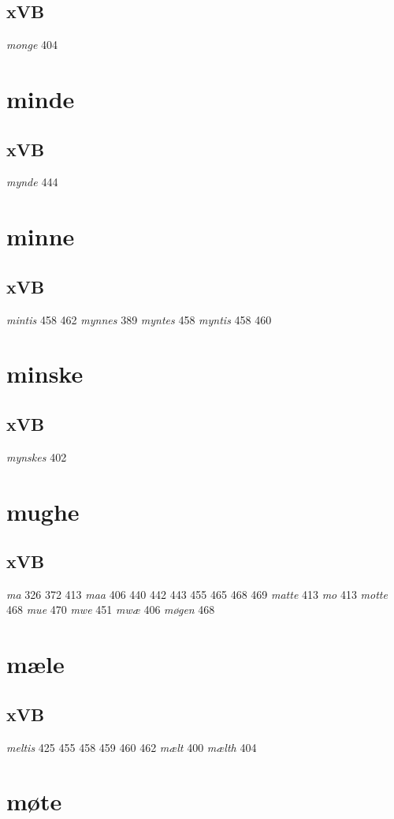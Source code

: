 \documentclass[a4paper,twocolumn]{article}
\begin{document}
\subsection{xVB}
\label{sec:orge8e309a}
\emph{monge} 404 
\section{minde}
\label{sec:org60bbaa4}
\subsection{xVB}
\label{sec:orgc806b33}
\emph{mynde} 444 
\section{minne}
\label{sec:org4c94841}
\subsection{xVB}
\label{sec:orgbdddcf2}
\emph{mintis} 458 462 \emph{mynnes} 389 \emph{myntes} 458 \emph{myntis} 458 460 
\section{minske}
\label{sec:org5d0e291}
\subsection{xVB}
\label{sec:org9f4126d}
\emph{mynskes} 402 
\section{mughe}
\label{sec:org2d356df}
\subsection{xVB}
\label{sec:orgaef79c8}
\emph{ma} 326 372 413 \emph{maa} 406 440 442 443 455 465 468 469 \emph{matte} 413 \emph{mo} 413 \emph{motte} 468 \emph{mue} 470 \emph{mwe} 451 \emph{mwæ} 406 \emph{møgen} 468 
\section{mæle}
\label{sec:org4cde01d}
\subsection{xVB}
\label{sec:org161a774}
\emph{meltis} 425 455 458 459 460 462 \emph{mælt} 400 \emph{mælth} 404 
\section{møte}
\label{sec:org416de0d}
\end{document}
